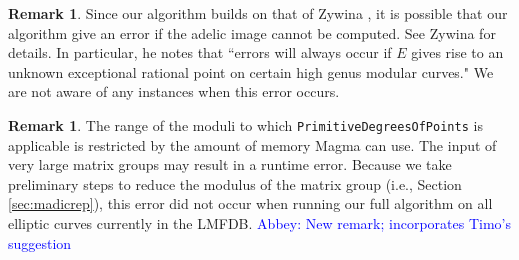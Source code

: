 \documentclass[11pt,reqno]{amsart}
\theoremstyle{plain}
\theoremstyle{definition}
\newtheorem{remark}[theorem]{Remark}
\newcommand{\abbey}[1]{\textcolor{blue}{Abbey: #1}}
\begin{document}
\begin{remark}
Since our algorithm builds on that of Zywina \cite{ZywinaAlgorithm}, it is possible that our algorithm give an error if the adelic image cannot be computed. See Zywina \cite{ZywinaImagesGit} for details. In particular, he notes that ``errors will always occur if $E$ gives rise to an unknown exceptional rational point on certain high genus modular curves." We are not aware of any instances when this error occurs.
\end{remark}

\begin{remark} 
The range of the moduli to which \texttt{PrimitiveDegreesOfPoints} is applicable is restricted by the amount of memory Magma can use. The input of very large matrix groups may result in a runtime error. Because we take preliminary steps to reduce the modulus of the matrix group (i.e., Section \ref{sec:madicrep}), this error did not occur when running our full algorithm on all elliptic curves currently in the LMFDB. \abbey{New remark; incorporates Timo's suggestion}
\end{remark}
\end{document}
